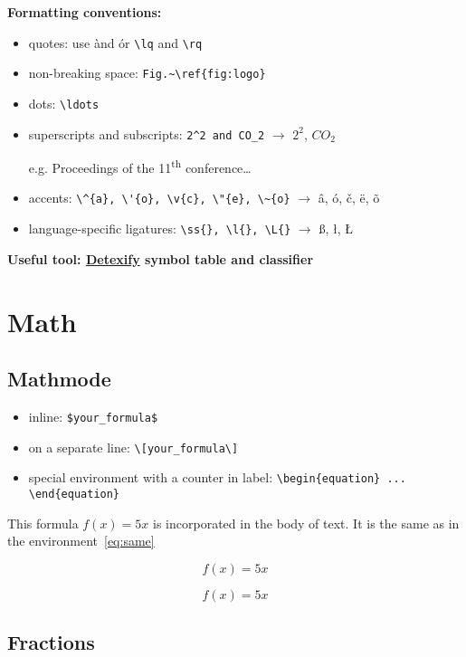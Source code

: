 \documentclass[a4paper,11pt]{article}
\begin{document}
\textbf{Formatting conventions:}

\begin{itemize}
	\item quotes: use \` and \' or \verb|\lq| and \verb|\rq| 
	\item non-breaking space: \verb|Fig.~\ref{fig:logo}|
	\item dots: \verb|\ldots|
	\item superscripts and subscripts: \verb|2^2 and CO_2| $\rightarrow$ $2^2$, $CO_2$
	
	e.g. Proceedings of the 11\textsuperscript{th} conference\ldots
	
	\item accents: \verb|\^{a}, \'{o}, \v{c}, \"{e}, \~{o}| $\rightarrow$ \^{a}, \'{o}, \v{c}, \"{e}, \~{o}
	\item language-specific ligatures: \verb|\ss{}, \l{}, \L{}| $\rightarrow$ \ss{}, \l{}, \L{}
\end{itemize}

\textbf{Useful tool: \href{http://detexify.kirelabs.org/symbols.html}{Detexify} symbol table and classifier}

\section{Math}

\subsection{Mathmode}

\begin{itemize}
	\item inline: \verb|$your_formula$|
	\item on a separate line: \verb|\[your_formula\]|
	\item special environment with a counter in label: \verb|\begin{equation} ... \end{equation}|
\end{itemize}

This formula $f(x)=5x$ is incorporated in the body of text. It is the same as in the environment~\ref{eq:same}

\[ f(x)=5x \]

\begin{equation}\label{eq:same}
f(x)=5x
\end{equation}

\subsection{Fractions}
\end{document}
